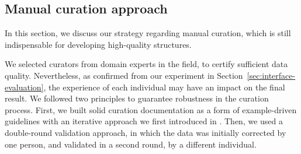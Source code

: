 




\subsection{Manual curation approach}
\label{sec:data-correction}
\label{subsec:manual_correction}

In this section, we discuss our strategy regarding manual curation, which is still indispensable for developing high-quality structures. 

We selected curators from domain experts in the field, to certify sufficient data quality. 
Nevertheless, as confirmed from our experiment in Section~\ref{sec:interface-evaluation}, the experience of each individual may have an impact on the final result.
We followed two principles to guarantee robustness in the curation process. 
First, we built solid curation documentation as a form of example-driven guidelines with an iterative approach we first introduced in \cite{foppiano2021supermat}. 
Then, we used a double-round validation approach, in which the data was initially corrected by one person, and validated in a second round, by a different individual. 


